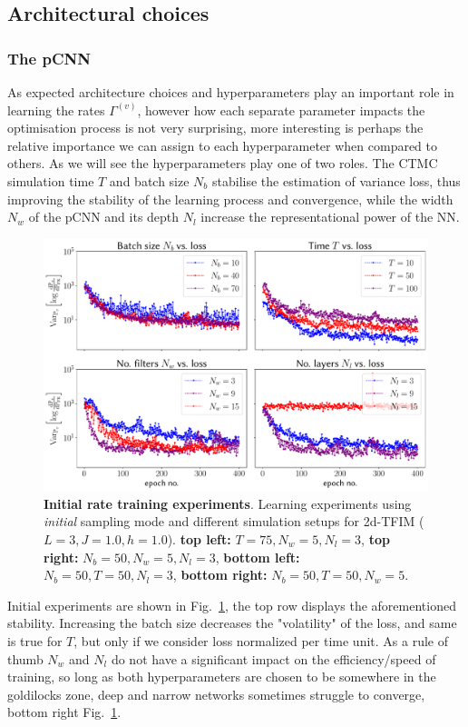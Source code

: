 \newpage
\subsection{Architectural choices}
\subsubsection{The pCNN}
As expected architecture choices and hyperparameters play an important role in learning the rates $\Gamma^{(v)}$, however how each separate parameter impacts the optimisation process is not very surprising, more interesting is perhaps the relative importance we can assign to each hyperparameter when compared to others. As we will see the hyperparameters play one of two roles. The CTMC simulation time $T$ and batch size $N_b$ stabilise the estimation of variance loss, thus improving the stability of the learning process and convergence, while the width $N_w$ of the pCNN and its depth $N_l$ increase the representational power of the NN.
\begin{figure}[H]
	\centering
	\includegraphics[width=\linewidth]{Chapter5/Figs/Vector/init_test_learning}
	\caption[Initial rate training experiments]{\textbf{Initial rate training experiments}. Learning experiments using \emph{initial} sampling mode and different simulation setups for 2d-TFIM ($L=3, J=1.0, h=1.0$). \textbf{top left:} $T = 75, N_w = 5, N_l = 3$, \textbf{top right:} $N_b = 50, N_w = 5, N_l = 3$, \textbf{bottom left:} $N_b = 50, T = 50, N_l = 3$, \textbf{bottom right:} $N_b = 50, T = 50, N_w = 5$.}
	\label{fig:inittestlearning}
\end{figure}
Initial experiments are shown in Fig.~\ref{fig:inittestlearning}, the top row displays the aforementioned stability. Increasing the batch size decreases the "volatility" of the loss, and same is true for $T$, but only if we consider loss normalized per time unit. As a rule of thumb $N_w$ and $N_l$ do not have a significant impact on the efficiency/speed of training, so long as both hyperparameters are chosen to be somewhere in the goldilocks zone, deep and narrow networks sometimes struggle to converge, bottom right Fig.~\ref{fig:inittestlearning}.

